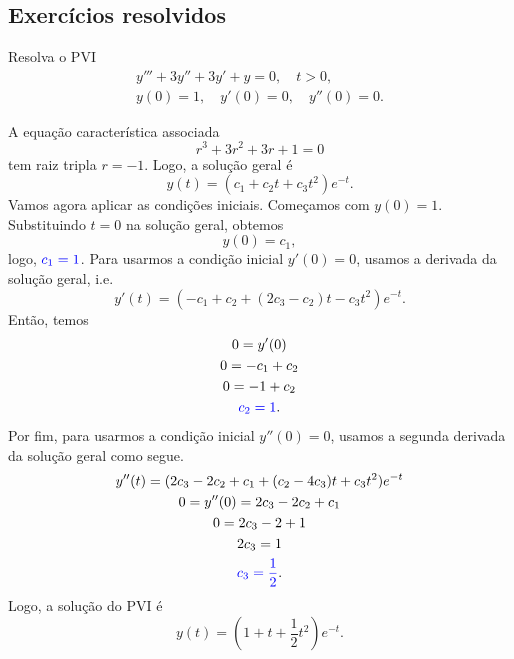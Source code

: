 \subsection*{Exercícios resolvidos}

\begin{exeresol}\label{exeresol:edolin_on_h}
  Resolva o PVI
  \begin{align}
    y''' + 3y'' + 3y' + y = 0,\quad t>0,\\
    y(0)=1,\quad y'(0)=0,\quad y''(0)=0.
  \end{align}
\end{exeresol}
\begin{resol}
  A equação característica associada
  \begin{equation}
    r^3 + 3r^2 + 3r + 1 = 0
  \end{equation}
  tem raiz tripla $r=-1$. Logo, a solução geral é
  \begin{equation}
    y(t) = (c_1 + c_2t + c_3t^2)e^{-t}.
  \end{equation}
  Vamos agora aplicar as condições iniciais. Começamos com $y(0)=1$. Substituindo $t=0$ na solução geral, obtemos
  \begin{equation}
    y(0) = c_1,
  \end{equation}
  logo, ${\color{blue}c_1 = 1}$. Para usarmos a condição inicial $y'(0)=0$, usamos a derivada da solução geral, i.e.
  \begin{equation}
    y'(t) = (-c_1 + c_2 + (2c_3-c_2)t - c_3t^2)e^{-t}.
  \end{equation}
  Então, temos
  \begin{gather}
    0 = y'(0) \\
    0  = -c_1 + c_2 \\
    0  = -1 + c_2 \\
    {\color{blue}c_2 = 1}.
  \end{gather}
  Por fim, para usarmos a condição inicial $y''(0)=0$, usamos a segunda derivada da solução geral como segue.
  \begin{gather}
    y''(t) = (2c_3-2c_2+c_1 + (c_2 - 4c_3)t + c_3t^2)e^{-t}\\
    0=y''(0)=2c_3-2c_2+c_1\\
    0=2c_3-2+1\\
    2c_3=1\\
    {\color{blue}c_3=\frac{1}{2}}.
  \end{gather}
  Logo, a solução do PVI é
  \begin{equation}
    y(t) = \left(1 + t + \frac{1}{2}t^2\right)e^{-t}.
  \end{equation}
\end{resol}

